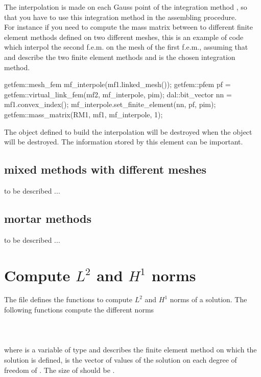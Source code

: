 \documentclass[11pt,a4paper]{article}
\begin{document}
The interpolation is made on each Gauss point of the integration method , so that you have to use this integration method in the assembling procedure.\\[0.5cm]

For instance if you need to compute the mass matrix between to different finite element methods defined on two different meshes, this is an example of code which interpol the second f.e.m. on the mesh of the first f.e.m., assuming that  and  describe the two finite element methods and  is the chosen integration method.\\[0.5cm]
\begin{cppcode}
  getfem::mesh\_fem mf\_interpole(mf1.linked\_mesh());
  getfem::pfem pf = getfem::virtual\_link\_fem(mf2, mf\_interpole, pim);
  dal::bit\_vector nn = mf1.convex\_index();
  mf\_interpole.set\_finite\_element(nn, pf, pim);
  getfem::mass\_matrix(RM1, mf1, mf\_interpole, 1);
\end{cppcode}

The object defined to build the interpolation will be destroyed when the object  will be destroyed. The information stored by this element can be important.

\subsection{mixed methods with different meshes}
  to be described ...
\subsection{mortar methods}
  to be described ...


\section{Compute $L^2$ and $H^1$ norms}

The file  defines the functions to compute $L^2$ and $H^1$ norms of a solution. The following functions compute the different norms\\[0.5cm]
 \\[0.5cm]
 \\[0.5cm]
 \\[0.5cm]
where  is a variable of type  and describes the finite element method on which the solution is defined,  is the vector of values of the solution on each degree of freedom of . The size of   should be .\\[0.5cm]
\end{document}
